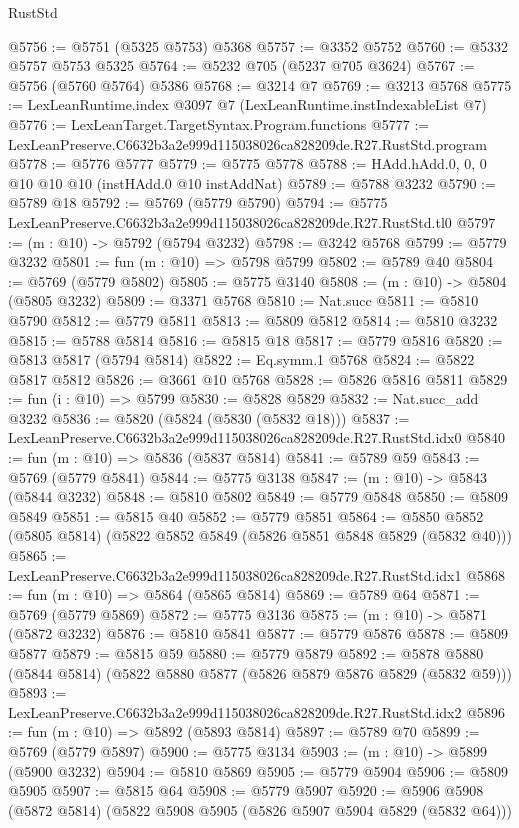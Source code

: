 \begin{lexlean}{RustStd}
\begin{coremodule}
@5756 := @5751 (@5325 @5753) @5368
@5757 := @3352 @5752
@5760 := @5332 @5757 @5753 @5325
@5764 := @5232 @705 (@5237 @705 @3624)
@5767 := @5756 (@5760 @5764) @5386
@5768 := @3214 @7
@5769 := @3213 @5768
@5775 := LexLeanRuntime.index @3097 @7 (LexLeanRuntime.instIndexableList @7)
@5776 := LexLeanTarget.TargetSyntax.Program.functions
@5777 := LexLeanPreserve.C6632b3a2e999d115038026ca828209de.R27.RustStd.program
@5778 := @5776 @5777
@5779 := @5775 @5778
@5788 := HAdd.hAdd.{0, 0, 0} @10 @10 @10 (instHAdd.{0} @10 instAddNat)
@5789 := @5788 @3232
@5790 := @5789 @18
@5792 := @5769 (@5779 @5790)
@5794 := @5775 LexLeanPreserve.C6632b3a2e999d115038026ca828209de.R27.RustStd.tl0
@5797 := (m : @10) -> @5792 (@5794 @3232)
@5798 := @3242 @5768
@5799 := @5779 @3232
@5801 := fun (m : @10) => @5798 @5799
@5802 := @5789 @40
@5804 := @5769 (@5779 @5802)
@5805 := @5775 @3140
@5808 := (m : @10) -> @5804 (@5805 @3232)
@5809 := @3371 @5768
@5810 := Nat.succ
@5811 := @5810 @5790
@5812 := @5779 @5811
@5813 := @5809 @5812
@5814 := @5810 @3232
@5815 := @5788 @5814
@5816 := @5815 @18
@5817 := @5779 @5816
@5820 := @5813 @5817 (@5794 @5814)
@5822 := Eq.symm.{1} @5768
@5824 := @5822 @5817 @5812
@5826 := @3661 @10 @5768
@5828 := @5826 @5816 @5811
@5829 := fun (i : @10) => @5799
@5830 := @5828 @5829
@5832 := Nat.succ_add @3232
@5836 := @5820 (@5824 (@5830 (@5832 @18)))
@5837 := LexLeanPreserve.C6632b3a2e999d115038026ca828209de.R27.RustStd.idx0
@5840 := fun (m : @10) => @5836 (@5837 @5814)
@5841 := @5789 @59
@5843 := @5769 (@5779 @5841)
@5844 := @5775 @3138
@5847 := (m : @10) -> @5843 (@5844 @3232)
@5848 := @5810 @5802
@5849 := @5779 @5848
@5850 := @5809 @5849
@5851 := @5815 @40
@5852 := @5779 @5851
@5864 := @5850 @5852 (@5805 @5814) (@5822 @5852 @5849 (@5826 @5851 @5848 @5829 (@5832 @40)))
@5865 := LexLeanPreserve.C6632b3a2e999d115038026ca828209de.R27.RustStd.idx1
@5868 := fun (m : @10) => @5864 (@5865 @5814)
@5869 := @5789 @64
@5871 := @5769 (@5779 @5869)
@5872 := @5775 @3136
@5875 := (m : @10) -> @5871 (@5872 @3232)
@5876 := @5810 @5841
@5877 := @5779 @5876
@5878 := @5809 @5877
@5879 := @5815 @59
@5880 := @5779 @5879
@5892 := @5878 @5880 (@5844 @5814) (@5822 @5880 @5877 (@5826 @5879 @5876 @5829 (@5832 @59)))
@5893 := LexLeanPreserve.C6632b3a2e999d115038026ca828209de.R27.RustStd.idx2
@5896 := fun (m : @10) => @5892 (@5893 @5814)
@5897 := @5789 @70
@5899 := @5769 (@5779 @5897)
@5900 := @5775 @3134
@5903 := (m : @10) -> @5899 (@5900 @3232)
@5904 := @5810 @5869
@5905 := @5779 @5904
@5906 := @5809 @5905
@5907 := @5815 @64
@5908 := @5779 @5907
@5920 := @5906 @5908 (@5872 @5814) (@5822 @5908 @5905 (@5826 @5907 @5904 @5829 (@5832 @64)))

\end{coremodule}
\end{lexlean}
